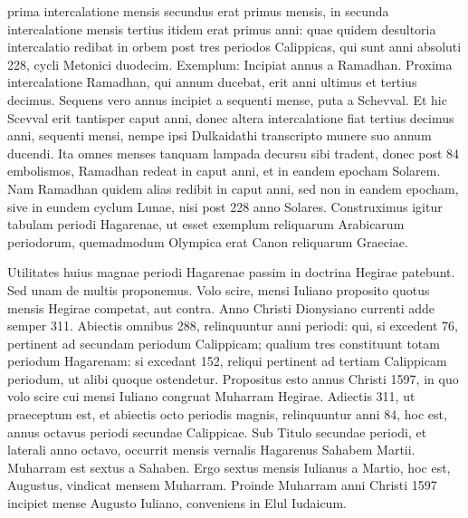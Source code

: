 prima intercalatione mensis secundus erat primus mensis, in secunda
intercalatione mensis tertius itidem erat primus anni: quae quidem
desultoria intercalatio redibat in orbem post tres periodos Calippicas,
qui sunt anni absoluti 228, cycli Metonici duodecim.
Exemplum:
Incipiat annus a Ramadhan.
Proxima intercalatione Ramadhan,
qui annum ducebat, erit anni ultimus et tertius decimus.
Sequens
vero annus incipiet a sequenti mense, puta a Schevval.
Et hic Scevval
erit tantisper caput anni, donec altera intercalatione fiat tertius
decimus anni, sequenti mensi, nempe ipsi Dulkaidathi transcripto
munere suo annum ducendi.
Ita omnes menses tanquam lampada
decursu sibi tradent, donec post 84 embolismos, Ramadhan redeat
in caput anni, et in eandem epocham Solarem.
Nam Ramadhan
quidem alias redibit in caput anni, sed non in eandem epocham, sive
in eundem cyclum Lunae, nisi post 228 anno Solares.
Construximus
igitur tabulam periodi Hagarenae, ut esset exemplum reliquarum
Arabicarum periodorum, quemadmodum Olympica erat Canon reliquarum
Graeciae.
%

\bigskip %

%
Utilitates huius magnae periodi Hagarenae passim in doctrina
Hegirae patebunt.
Sed unam de multis proponemus.
Volo scire,
mensi Iuliano proposito quotus mensis Hegirae competat, aut contra.
Anno Christi Dionysiano currenti adde semper 311.
Abiectis omnibus
288, relinquuntur anni periodi: qui, si excedent 76, pertinent ad
secundam periodum Calippicam; qualium tres constituunt totam periodum
Hagarenam: si excedant 152, reliqui pertinent ad tertiam Calippicam
periodum, ut alibi quoque ostendetur.
%
Propositus esto annus
Christi 1597, in quo volo scire cui mensi Iuliano congruat Muharram
Hegirae.
Adiectis 311, ut praeceptum est, et abiectis octo periodis magnis,
relinquuntur anni 84, hoc est, annus octavus periodi secundae %
Calippicae.
Sub Titulo secundae periodi, et laterali anno octavo, occurrit
mensis vernalis Hagarenus Sahabem  Martii.
Muharram est sextus
a Sahaben.
Ergo sextus mensis Iulianus a Martio, hoc est, Augustus, vindicat
mensem Muharram.
Proinde Muharram anni Christi 1597 incipiet
mense Augusto Iuliano, conveniens in Elul Iudaicum.
%
